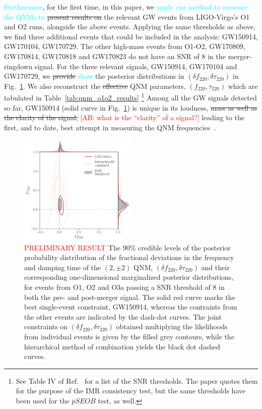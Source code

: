 \documentclass[twocolumn,prd,aps,superscriptaddress,preprintnumbers,tightenlines,showpacs,nofootinbib,eqsecnum,amsfonts,amsmath]{revtex4-1}
\newcommand{\ab}[1]{\textcolor{cyan}{#1}}
\newcommand{\comment}[1]{\textcolor{red}{[#1]}}
\newcommand{\df}[1]{\delta f_{\text{#1}}}
\newcommand{\dtau}[1]{\delta \tau_{\text{#1}}}
\newcommand{\fngr}[1]{f_{\text{#1}}}
\newcommand{\taungr}[1]{\tau_{\text{#1}}}
\begin{document}
\ab{Furthermore}, for the first time, in this paper, we \ab{apply our method to 
measure the QNMs to} \sout{present results on} the relevant
GW events from LIGO-Virgo's O1 and O2 runs, alongside
the above events. Applying the same thresholds as above, we find three
additional events that could be included in the analysis: GW150914,
GW170104, GW170729. The other high-mass events from O1-O2, GW170809,
GW170814, GW170818 and GW170823 do not have an SNR of $8$ in the
merger-ringdown signal. For the three relevant signals, GW150914,
GW170104 and GW170729, we \sout{provide} \ab{show} the posterior distributions in
$(\df{220}, \dtau{220})$ in Fig.~\ref{fig:o1o2_events}. We also
reconstruct the \sout{effective} QNM parameters, $(\fngr{220}, \taungr{220})$
which are tabulated in Table~\ref{tab:qnm_o1o2_results} \footnote{See
  Table IV of Ref.~\cite{Abbott:2020jks} for a list of the SNR
  thresholds. The paper quotes them for the purpose of the IMR
  consistency test, but the same thresholds have been used for the
  $pSEOB$ test, as well.} Among all the GW signals detected so far,
GW150914 (solid curve in Fig.~\ref{fig:o1o2_events}) is unique in its
loudness, \sout{mass as well as the clarity of the signal,} \comment{AB: what 
is the ``clarity'' of a signal?} leading to the
first, and to date, best attempt in measuring the QNM frequencies~\cite{}. 

\begin{figure}[h!]
	\includegraphics[width=0.5\textwidth]{figures/rin_pseob_results.pdf}
	\caption{\textcolor{red}{PRELIMINARY RESULT} The 90\% credible levels of the posterior probability distribution of the fractional deviations in the frequency and damping time of the $(2,\pm 2)$ QNM, $(\df{220},\dtau{220})$ and their corresponding one-dimensional marginalized posterior distributions, for events from O1, O2 and O3a passing a SNR threshold of $8$ in both the pre- and post-merger signal. The solid red curve marks the best single-event constraint, GW150914, whereas the contraints from the other events are indicated by the dash-dot curves. The joint constraints on $(\df{220},\dtau{220})$ obtained multiplying the likelihoods from individual events is given by the filled grey contours, while the hierarchical method of combination yields the black dot dashed curves.}
	\label{fig:o1o2_events}
\end{figure}
\end{document}
